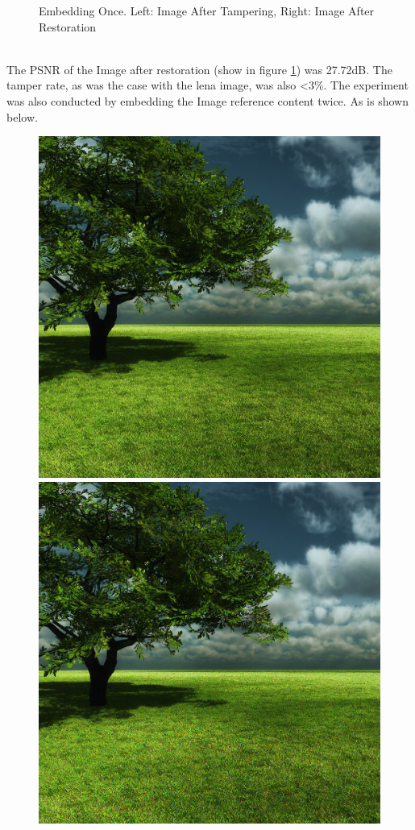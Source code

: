 \documentclass[12pt]{article}
\begin{document}
\begin{figure}[h]
{}%
\caption{Embedding Once. Left: Image After Tampering, Right: Image After Restoration}
\label{fig:treeEmbedOnceRestoration}
\end{figure}

\hspace{0pt} \\
The PSNR of the Image after restoration (show in figure \ref{fig:treeEmbedOnceRestoration}) was 27.72dB.
The tamper rate, as was the case with the lena image, was also \textless 3\%.
The experiment was also conducted by embedding the Image reference content twice.
As is shown below.

\begin{figure}[h]
\centerline{%
\includegraphics[scale=0.3375]{"tree"}%
\hspace{0.1cm}
\includegraphics[scale=0.45]{"Tree Embed twice 0.8 threshold/finalImage"}%
}
\end{figure}
\end{document}
